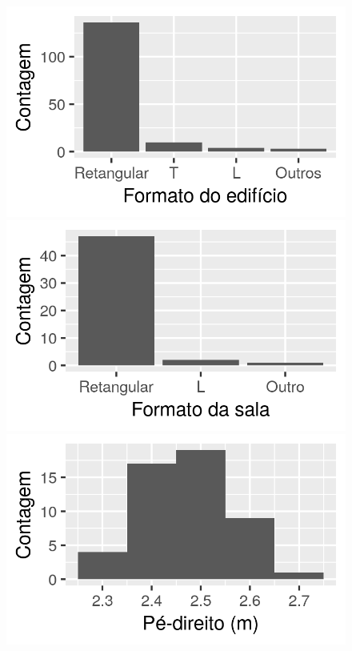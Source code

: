 \documentclass[brazil,hardcopy,openany,a4paper]{ufscthesis}
\begin{document}
\begin{figure}[H]
\begin{minipage}{.5\textwidth}
		\end{minipage}
		\centering
		\begin{minipage}{.5\textwidth}
			\centering
			\includegraphics[width=\linewidth]{img/hist_formato.png}
		\end{minipage}%
		\begin{minipage}{.5\textwidth}
			\centering
			\includegraphics[width=\linewidth]{img/hist_formato_sala.png}
		\end{minipage}
		\centering
		\begin{minipage}{.5\textwidth}
			\centering
			\includegraphics[width=\linewidth]{img/hist_pe_direito.png}

\end{minipage}
\end{figure}
\end{document}
